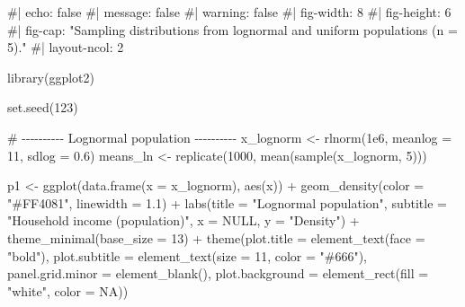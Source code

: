 \documentclass[
  letterpaper,
  DIV=11,
  numbers=noendperiod]{scrreprt}
\newenvironment{Shaded}{\begin{snugshade}}{\end{snugshade}}
\newcommand{\AttributeTok}[1]{\textcolor[rgb]{0.40,0.45,0.13}{#1}}
\newcommand{\CommentTok}[1]{\textcolor[rgb]{0.37,0.37,0.37}{#1}}
\newcommand{\ConstantTok}[1]{\textcolor[rgb]{0.56,0.35,0.01}{#1}}
\newcommand{\DecValTok}[1]{\textcolor[rgb]{0.68,0.00,0.00}{#1}}
\newcommand{\FloatTok}[1]{\textcolor[rgb]{0.68,0.00,0.00}{#1}}
\newcommand{\FunctionTok}[1]{\textcolor[rgb]{0.28,0.35,0.67}{#1}}
\newcommand{\NormalTok}[1]{\textcolor[rgb]{0.00,0.23,0.31}{#1}}
\newcommand{\OtherTok}[1]{\textcolor[rgb]{0.00,0.23,0.31}{#1}}
\newcommand{\SpecialCharTok}[1]{\textcolor[rgb]{0.37,0.37,0.37}{#1}}
\newcommand{\StringTok}[1]{\textcolor[rgb]{0.13,0.47,0.30}{#1}}
\begin{document}
\begin{Shaded}
\begin{Highlighting}[]
\CommentTok{\#| echo: false}
\CommentTok{\#| message: false}
\CommentTok{\#| warning: false}
\CommentTok{\#| fig{-}width: 8}
\CommentTok{\#| fig{-}height: 6}
\CommentTok{\#| fig{-}cap: "Sampling distributions from lognormal and uniform populations (n = 5)."}
\CommentTok{\#| layout{-}ncol: 2}

\FunctionTok{library}\NormalTok{(ggplot2)}

\FunctionTok{set.seed}\NormalTok{(}\DecValTok{123}\NormalTok{)}

\CommentTok{\# {-}{-}{-}{-}{-}{-}{-}{-}{-}{-} Lognormal population {-}{-}{-}{-}{-}{-}{-}{-}{-}{-}}
\NormalTok{x\_lognorm }\OtherTok{\textless{}{-}} \FunctionTok{rlnorm}\NormalTok{(}\FloatTok{1e6}\NormalTok{, }\AttributeTok{meanlog =} \DecValTok{11}\NormalTok{, }\AttributeTok{sdlog =} \FloatTok{0.6}\NormalTok{)}
\NormalTok{means\_ln  }\OtherTok{\textless{}{-}} \FunctionTok{replicate}\NormalTok{(}\DecValTok{1000}\NormalTok{, }\FunctionTok{mean}\NormalTok{(}\FunctionTok{sample}\NormalTok{(x\_lognorm, }\DecValTok{5}\NormalTok{)))}

\NormalTok{p1 }\OtherTok{\textless{}{-}} \FunctionTok{ggplot}\NormalTok{(}\FunctionTok{data.frame}\NormalTok{(}\AttributeTok{x =}\NormalTok{ x\_lognorm), }\FunctionTok{aes}\NormalTok{(x)) }\SpecialCharTok{+}
  \FunctionTok{geom\_density}\NormalTok{(}\AttributeTok{color =} \StringTok{"\#FF4081"}\NormalTok{, }\AttributeTok{linewidth =} \FloatTok{1.1}\NormalTok{) }\SpecialCharTok{+}
  \FunctionTok{labs}\NormalTok{(}\AttributeTok{title =} \StringTok{"Lognormal population"}\NormalTok{,}
       \AttributeTok{subtitle =} \StringTok{"Household income (population)"}\NormalTok{,}
       \AttributeTok{x =} \ConstantTok{NULL}\NormalTok{, }\AttributeTok{y =} \StringTok{"Density"}\NormalTok{) }\SpecialCharTok{+}
  \FunctionTok{theme\_minimal}\NormalTok{(}\AttributeTok{base\_size =} \DecValTok{13}\NormalTok{) }\SpecialCharTok{+}
  \FunctionTok{theme}\NormalTok{(}\AttributeTok{plot.title =} \FunctionTok{element\_text}\NormalTok{(}\AttributeTok{face =} \StringTok{"bold"}\NormalTok{),}
        \AttributeTok{plot.subtitle =} \FunctionTok{element\_text}\NormalTok{(}\AttributeTok{size =} \DecValTok{11}\NormalTok{, }\AttributeTok{color =} \StringTok{"\#666"}\NormalTok{),}
        \AttributeTok{panel.grid.minor =} \FunctionTok{element\_blank}\NormalTok{(),}
        \AttributeTok{plot.background =} \FunctionTok{element\_rect}\NormalTok{(}\AttributeTok{fill =} \StringTok{"white"}\NormalTok{, }\AttributeTok{color =} \ConstantTok{NA}\NormalTok{))}


\end{Highlighting}
\end{Shaded}
\end{document}

